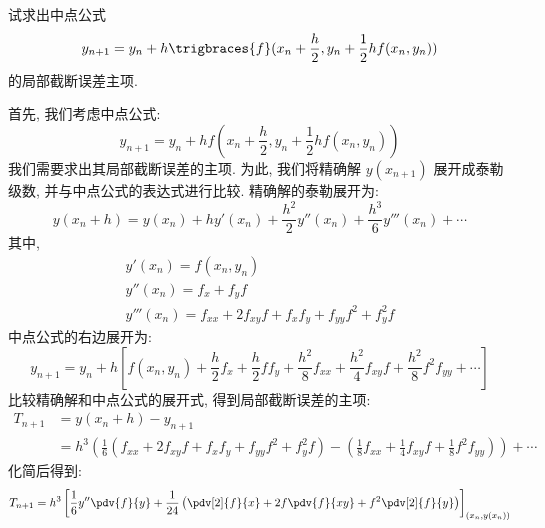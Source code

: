 \documentclass[lang = zh]{iwork}
\begin{document}
\begin{prob}
  试求出中点公式
  \begin{equation*}
    y_{n + 1} = y_n + h \trigbraces{f}(x_n + \frac{h}{2}, y_n + \frac{1}{2} h f(x_n, y_n))
  \end{equation*}
  的局部截断误差主项.
\end{prob}
\begin{sol}
  首先, 我们考虑中点公式:
  \begin{equation*} y_{n+1} = y_n + h f\left(x_n + \frac{h}{2}, y_n + \frac{1}{2} h f(x_n, y_n)\right) \end{equation*}
  我们需要求出其局部截断误差的主项.
  为此, 我们将精确解 $y(x_{n+1})$ 展开成泰勒级数, 并与中点公式的表达式进行比较.
  精确解的泰勒展开为:
  \begin{equation*}
    y(x_n + h) = y(x_n) + h y'(x_n) + \frac{h^2}{2} y''(x_n) + \frac{h^3}{6} y'''(x_n) + \cdots
  \end{equation*}
  其中,
  \begin{gather*}
    y'(x_n) = f(x_n, y_n)  \\
    y''(x_n) = f_x + f_y f \\
    y'''(x_n) = f_{xx} + 2 f_{xy} f + f_x f_y + f_{yy} f^2 + f_y^2 f
  \end{gather*}
  中点公式的右边展开为:
  \begin{equation*}
    y_{n+1} = y_n + h \left[ f(x_n, y_n) + \frac{h}{2} f_x + \frac{h}{2} f f_y + \frac{h^2}{8} f_{xx} + \frac{h^2}{4} f_{xy} f + \frac{h^2}{8} f^2 f_{yy} + \cdots \right]
  \end{equation*}
  比较精确解和中点公式的展开式, 得到局部截断误差的主项:
  \begin{equation*}
    \begin{split}
      T_{n+1}
       & = y(x_n + h) - y_{n+1}                                                                                                                                                               \\
       & = h^3 \left( \frac{1}{6} (f_{xx} + 2 f_{xy} f + f_x f_y + f_{yy} f^2 + f_y^2 f) - \left( \frac{1}{8} f_{xx} + \frac{1}{4} f_{xy} f + \frac{1}{8} f^2 f_{yy} \right) \right) + \cdots
    \end{split}
  \end{equation*}
  化简后得到:
  \begin{equation*} T_{n+1} = h^3 \left[ \frac{1}{6} y'' \pdv{f}{y} + \frac{1}{24} \left( \pdv[2]{f}{x} + 2 f \pdv{f}{x y} + f^2 \pdv[2]{f}{y} \right) \right]_{(x_n, y(x_n))} \end{equation*}
\end{sol}
\end{document}
